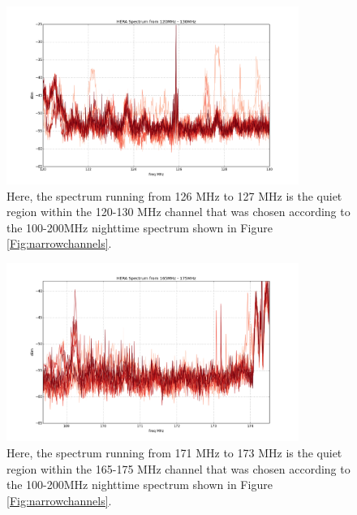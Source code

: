 \documentclass[preprint]{aastex}  %
\begin{document}
\begin{figure}[H]
	\begin{center}
	\includegraphics[width =0.85\textwidth]{spectra_plots/120130allnight}
	\caption{Here, the spectrum running from 126 MHz to 127 MHz is the quiet region within the 120-130 MHz channel that was chosen according to the 100-200MHz nighttime spectrum shown in Figure \ref{Fig:narrowchannels}.
\label{Fig:120130allnight} }
	\end{center}
\end{figure}

\begin{figure}[H]
	\begin{center}
	\includegraphics[width =0.85\textwidth]{spectra_plots/clean171173}
	\caption{Here, the spectrum running from 171 MHz to 173 MHz is the quiet region within the 165-175 MHz channel that was chosen according to the 100-200MHz nighttime spectrum shown in Figure \ref{Fig:narrowchannels}.
\label{Fig:165175allnight} }
	\end{center}
\end{figure}
\end{document}
